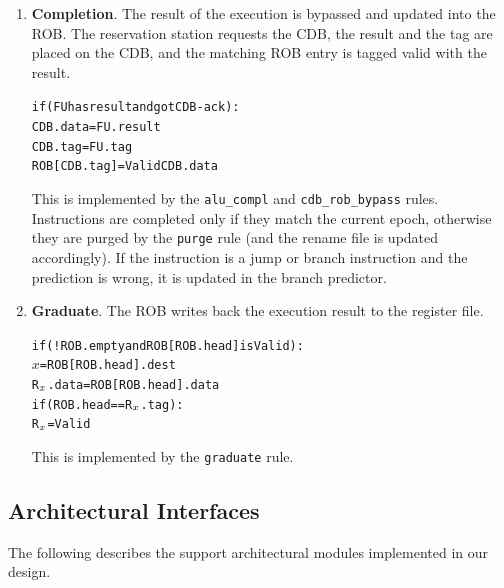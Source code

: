 \documentclass[12pt]{article}
\newcommand{\mtt}[1]{\(#1\)}
\begin{document}
\begin{enumerate}
    \item \textbf{Completion}. The result of the execution is bypassed and updated into the ROB. The
reservation station requests the CDB, the result and the tag are placed on the
CDB, and the matching ROB entry is tagged valid with the result.
        \begin{alltt}
            if (FU has result and got CDB-ack):
                CDB.data = FU.result
                CDB.tag = FU.tag
                ROB[CDB.tag] = Valid CDB.data
        \end{alltt}
        This is implemented by the \verb=alu_compl= and \verb=cdb_rob_bypass= rules.
Instructions are completed only if they match the current epoch, otherwise
they are purged by the \verb=purge= rule (and the rename file is updated
accordingly). If the instruction is a jump or branch instruction and the
prediction is wrong, it is updated in the branch predictor.
    \item \textbf{Graduate}. The ROB writes back the execution result to the register file. 
        \begin{alltt}
            if (!ROB.empty and ROB[ROB.head] is Valid):
                \mtt{x} = ROB[ROB.head].dest
                R\mtt{\sb{x}}.data = ROB[ROB.head].data
                if (ROB.head == R\mtt{\sb{x}}.tag):
                    R\mtt{\sb{x}} = Valid
            
        \end{alltt}
        This is implemented by the \verb=graduate= rule.
\end{enumerate}

\subsection{Architectural Interfaces\label{sec:modules}}

The following describes the support architectural modules implemented in our design.
\end{document}
